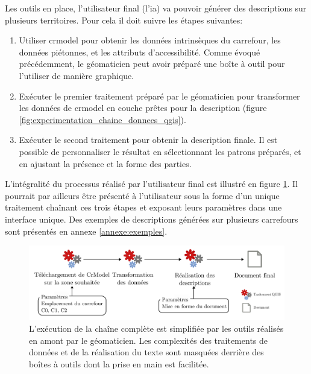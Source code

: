 Les outils en place, l'utilisateur final (l'\gls{ia}) va pouvoir générer des descriptions sur plusieurs territoires. Pour cela il doit suivre les étapes suivantes:

\begin{enumerate}
    \item Utiliser crmodel pour obtenir les données intrinsèques du carrefour, les données piétonnes, et les attributs d'accessibilité. Comme évoqué précédemment, le géomaticien peut avoir préparé une boîte à outil pour l'utiliser de manière graphique.
    \item Exécuter le premier traitement préparé par le géomaticien pour transformer les données  de crmodel en couche prêtes pour la description (figure \ref{fig:experimentation_chaine_donnees_qgis}).
    \item Exécuter le second traitement pour obtenir la description finale. Il est possible de personnaliser le résultat en sélectionnant les patrons préparés, et en ajustant la présence et la forme des parties. 
\end{enumerate}

L'intégralité du processus réalisé par l'utilisateur final est illustré en figure \ref{fig:experimentation_processus_realisation_utilisateur}. Il pourrait par ailleurs être présenté à l'utilisateur sous la forme d'un unique traitement chaînant ces trois étapes et exposant leurs paramètres dans une interface unique. Des exemples de descriptions générées sur plusieurs carrefours sont présentés en annexe \ref{annexe:exemples}.

\begin{figure}[ht]
    \centering
    \includegraphics[width=\textwidth]{images/experimentation/pipeline_utilisateur.pdf}
    \caption[Étapes d'exécution de la chaîne de description par l'utilisateur]{L'exécution de la chaîne complète est simplifiée par les outils réalisés en amont par le géomaticien. Les complexités des traitements de données et de la réalisation du texte sont masquées derrière des boîtes à outils dont la prise en main est facilitée.}
    \label{fig:experimentation_processus_realisation_utilisateur}
\end{figure}

